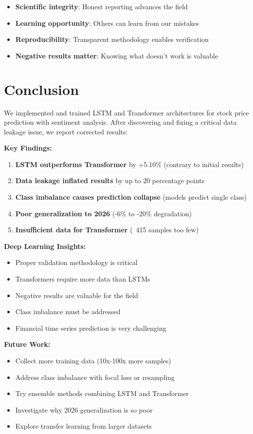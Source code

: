 \documentclass[10pt,twocolumn]{article}
\begin{document}
\begin{itemize}
\item \textbf{Scientific integrity}: Honest reporting advances the field
\item \textbf{Learning opportunity}: Others can learn from our mistakes
\item \textbf{Reproducibility}: Transparent methodology enables verification
\item \textbf{Negative results matter}: Knowing what doesn't work is valuable
\end{itemize}

\section{Conclusion}

We implemented and trained LSTM and Transformer architectures for stock price prediction with sentiment analysis. After discovering and fixing a critical data leakage issue, we report corrected results:

\textbf{Key Findings:}
\begin{enumerate}
\item \textbf{LSTM outperforms Transformer} by +5.10\% (contrary to initial results)
\item \textbf{Data leakage inflated results} by up to 20 percentage points
\item \textbf{Class imbalance causes prediction collapse} (models predict single class)
\item \textbf{Poor generalization to 2026} (-6\% to -20\% degradation)
\item \textbf{Insufficient data for Transformer} (~415 samples too few)
\end{enumerate}

\textbf{Deep Learning Insights:}
\begin{itemize}
\item Proper validation methodology is critical
\item Transformers require more data than LSTMs
\item Negative results are valuable for the field
\item Class imbalance must be addressed
\item Financial time series prediction is very challenging
\end{itemize}

\textbf{Future Work:}
\begin{itemize}
\item Collect more training data (10x-100x more samples)
\item Address class imbalance with focal loss or resampling
\item Try ensemble methods combining LSTM and Transformer
\item Investigate why 2026 generalization is so poor
\item Explore transfer learning from larger datasets
\end{itemize}
\end{document}
